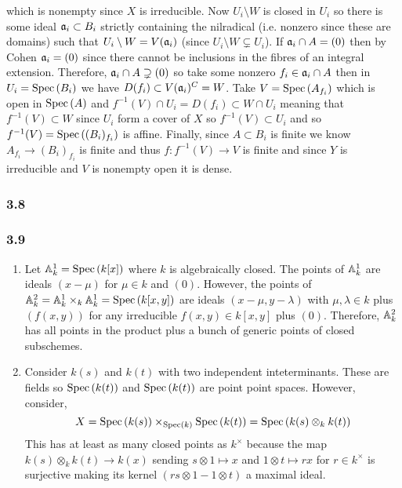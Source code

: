 \documentclass[12pt]{article}
\begin{document}
which is nonempty since $X$ is irreducible. Now $U_i \setminus W$ is closed in $U_i$ so there is some ideal $\mathfrak{a}_i \subset B_i$ strictly containing the nilradical (i.e. nonzero since these are domains) such that $U_i \setminus W = V(\mathfrak{a}_i)$ (since $U_i \setminus W \subsetneq U_i$). If $\mathfrak{a}_i \cap A = (0)$ then by Cohen $\mathfrak{a}_i = (0)$ since there cannot be inclusions in the fibres of an integral extension. Therefore, $\mathfrak{a}_i \cap A \supsetneq (0)$ so take some nonzero $f_i \in \mathfrak{a}_i \cap A$ then in $U_i = \mathrm{Spec}\left( B_i \right)$ we have $D(f_i) \subset V(\mathfrak{a}_i)^C = W$. Take $V = \mathrm{Spec}\left( A_{f_i} \right)$ which is open in $\mathrm{Spec}\left( A \right)$ and $f^{-1}(V) \cap U_i = D(f_i) \subset W \cap U_i$ meaning that $f^{-1}(V) \subset W$ since $U_i$ form a cover of $X$ so $f^{-1}(V) \subset U_i$ and so $f^{-1}(V) = \mathrm{Spec}\left( (B_i)_{f_i} \right)$ is affine. Finally, since $A \subset B_i$ is finite we know $A_{f_i} \to (B_i)_{f_i}$ is finite and thus $f : f^{-1}(V) \to V$ is finite and since $Y$ is irreducible and $V$ is nonempty open it is dense.

\subsubsection{3.8}

\subsubsection{3.9}

\begin{enumerate}
\item Let $\mathbb{A}^1_k = \mathrm{Spec}\left( k[x] \right)$ where $k$ is algebraically closed. The points of $\mathbb{A}^1_k$ are ideals $(x - \mu)$ for $\mu \in k$ and $(0)$. However, the points of $\mathbb{A}^2_k = \mathbb{A}^1_k \times_k \mathbb{A}^1_k = \mathrm{Spec}\left( k[x,y] \right)$ are ideals $(x - \mu, y - \lambda)$ with $\mu, \lambda \in k$ plus $(f(x,y))$ for any irreducible $f(x,y) \in k[x,y]$ plus $(0)$. Therefore, $\mathbb{A}^2_k$ has all points in the product plus a bunch of generic points of closed subschemes.

\item Consider $k(s)$ and $k(t)$ with two independent inteterminants. These are fields so $\mathrm{Spec}\left( k(t) \right)$ and $\mathrm{Spec}\left( k(t) \right)$ are point point spaces. However, consider,
\[ X = \mathrm{Spec}\left( k(s) \right) \times_{\mathrm{Spec}\left( k \right)} \mathrm{Spec}\left( k(t) \right) = \mathrm{Spec}\left( k(s) \otimes_k k(t) \right) \]
This has at least as many closed points as $k^\times$ because the map $k(s) \otimes_k k(t) \to k(x)$ sending $s \otimes 1 \mapsto x$ and $1 \otimes t \mapsto r x$ for $r \in k^\times$ is surjective making its kernel $(rs \otimes 1 - 1 \otimes t)$  a maximal ideal. 
\end{enumerate}
\end{document}
